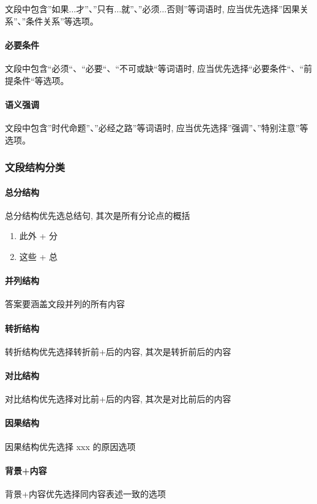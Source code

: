 文段中包含''如果$\dots$才''、''只有$\dots$就''、''必须$\dots$否则''等词语时, 应当优先选择''因果关系''、''条件关系''等选项。

\paragraph{必要条件}

文段中包含``必须``、``必要``、``不可或缺``等词语时, 应当优先选择``必要条件``、``前提条件``等选项。

\paragraph{语义强调}

文段中包含''时代命题''、''必经之路''等词语时, 应当优先选择''强调''、''特别注意''等选项。

\subsubsection{文段结构分类}
\paragraph{总分结构} 总分结构优先选总结句, 其次是所有分论点的概括
\begin{multicols}{2}
	\begin{enumerate}
		\item 此外 + 分
		\item 这些 + 总
	\end{enumerate}
\end{multicols}

\paragraph{并列结构} 答案要涵盖文段并列的所有内容
\paragraph{转折结构} 转折结构优先选择转折前+后的内容, 其次是转折前后的内容
\paragraph{对比结构} 对比结构优先选择对比前+后的内容, 其次是对比前后的内容
\paragraph{因果结构} 因果结构优先选择 xxx 的原因选项
\paragraph{背景+内容} 背景+内容优先选择同内容表述一致的选项


